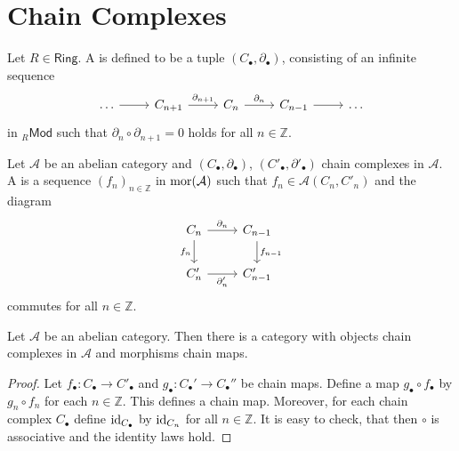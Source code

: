 \section*{Chain Complexes}

\begin{definition}
	Let $R \in \mathsf{Ring}$. A  is defined to be a tuple $(C_\bullet,\partial_\bullet)$, consisting of an infinite sequence
	\begin{equation*}
		\begin{tikzcd}
			\dots \arrow[r] & C_{n + 1} \arrow[r,"\partial_{n + 1}"] & C_n \arrow[r,"\partial_n"] & C_{n - 1} \arrow[r] & \dots
		\end{tikzcd}
	\end{equation*}
	\noindent in $_{R}\mathsf{Mod}$ such that $\partial_n\circ \partial_{n + 1} = 0$ holds for all $n \in \mathbb{Z}$.
\end{definition}

\begin{definition}
	Let $\mathcal{A}$ be an abelian category and $(C_\bullet,\partial_\bullet)$, $(C'_\bullet,\partial'_\bullet)$ chain complexes in $\mathcal{A}$. A  is a sequence $(f_n)_{n \in \mathbb{Z}}$ in $\operatorname{mor}(\mathcal{A})$ such that $f_n \in \mathcal{A}(C_n,C'_n)$ and the diagram
	\begin{equation*}
		\begin{tikzcd}
			C_n \arrow[r,"\partial_n"]\arrow[d,"f_n"'] & C_{n - 1} \arrow[d,"f_{n - 1}"] \\
			C'_n \ar[r,"\partial'_n"'] & C'_{n - 1}
		\end{tikzcd}
	\end{equation*}
	\noindent commutes for all $n \in \mathbb{Z}$.
\end{definition}

\begin{proposition}
	Let $\mathcal{A}$ be an abelian category. Then there is a category with objects chain complexes in $\mathcal{A}$ and morphisms chain maps.
	\label{prop:chA}
\end{proposition}

\begin{proof}
	Let $f_\bullet : C_\bullet \to C'_\bullet$ and $g_\bullet : C_\bullet' \to C_\bullet''$ be chain maps. Define a map $g_\bullet \circ f_\bullet$ by $g_n \circ f_n$ for each $n \in \mathbb{Z}$. This defines a chain map. Moreover, for each chain complex $C_\bullet$ define $\operatorname{id}_{C_\bullet}$ by $\operatorname{id}_{C_n}$ for all $n \in \mathbb{Z}$. It is easy to check, that then $\circ$ is associative and the identity laws hold.
\end{proof}


